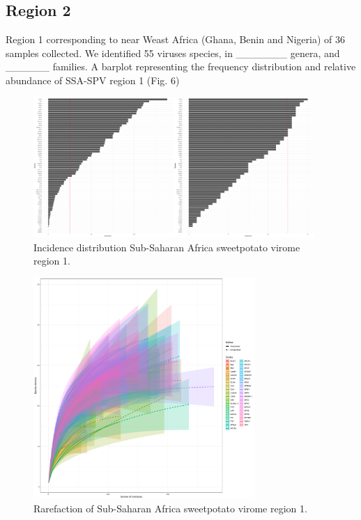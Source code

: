 \documentclass{article}
\begin{document}
\subsection{Region 2}

Region 1 corresponding to near Weast Africa (Ghana, Benin and Nigeria) of 36 samples collected. We identified 55 viruses species, in \_\_\_\_\_\_\_ genera, and \_\_\_\_\_\_ families.  A barplot representing the frequency distribution and relative abundance of SSA-SPV region 1 (Fig. 6)

\begin{figure}[h!]
\begin{center}
\includegraphics[width=0.95\textwidth]{../results/k-cluster2/2-kcluster_incidence_w+bFeb28.pdf
} %
\caption{Incidence distribution Sub-Saharan Africa sweetpotato virome region 1.}
\end{center}
\end{figure}


\begin{figure}[h!]
\begin{center}
\includegraphics[width=0.75\textwidth]{../results/k-cluster2/2-kcluster_rarefaction-iNEXT_Feb28.pdf
} %
\caption{Rarefaction of Sub-Saharan Africa sweetpotato virome region 1.}
\end{center}
\end{figure}
\end{document}
